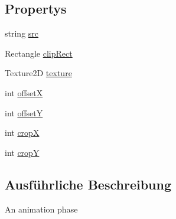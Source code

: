 \subsection*{Propertys}
\begin{DoxyCompactItemize}
\item 
string \hyperlink{class_gruppe22_1_1_client_1_1_visible_object_aefc65a7eb0629fcbb6b65360a37de953}{src}
\item 
Rectangle \hyperlink{class_gruppe22_1_1_client_1_1_visible_object_acc4d56dcd856ab5fb611f41095947e8d}{clip\-Rect}
\item 
Texture2\-D \hyperlink{class_gruppe22_1_1_client_1_1_visible_object_a09ac734c97a2e2745cf0f390a21e6458}{texture}
\item 
int \hyperlink{class_gruppe22_1_1_client_1_1_visible_object_ac0f65fd748befb3d9d841540319169b7}{offset\-X}
\item 
int \hyperlink{class_gruppe22_1_1_client_1_1_visible_object_a49c59c88d3d4f0c1d1fb7c6793c48942}{offset\-Y}
\item 
int \hyperlink{class_gruppe22_1_1_client_1_1_visible_object_afca2f875d4ee22e0c057bf4683659316}{crop\-X}
\item 
int \hyperlink{class_gruppe22_1_1_client_1_1_visible_object_a8ef54ba3e2b74532b8ff97be9234fe2c}{crop\-Y}
\end{DoxyCompactItemize}


\subsection{Ausführliche Beschreibung}
An animation phase 



